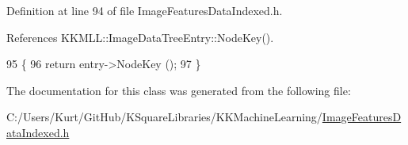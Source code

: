 Definition at line 94 of file Image\+Features\+Data\+Indexed.\+h.



References K\+K\+M\+L\+L\+::\+Image\+Data\+Tree\+Entry\+::\+Node\+Key().


\begin{DoxyCode}
95      \{
96         \textcolor{keywordflow}{return}  entry->NodeKey ();
97      \}
\end{DoxyCode}


The documentation for this class was generated from the following file\+:\begin{DoxyCompactItemize}
\item 
C\+:/\+Users/\+Kurt/\+Git\+Hub/\+K\+Square\+Libraries/\+K\+K\+Machine\+Learning/\hyperlink{_image_features_data_indexed_8h}{Image\+Features\+Data\+Indexed.\+h}\end{DoxyCompactItemize}

